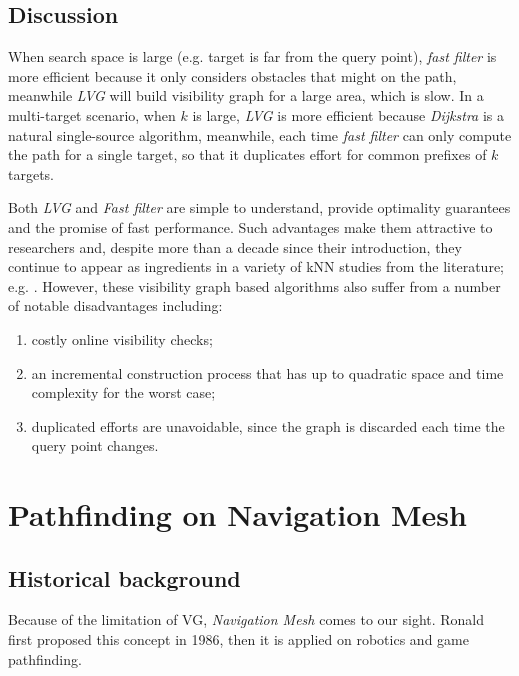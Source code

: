 \subsection{Discussion}
When search space is large (e.g. target is far from the query point), \textit{fast
filter}\cite{xia2004fast} is
more efficient because it only considers obstacles that might on the path, meanwhile
\textit{LVG}\cite{zhang2004spatial} will build visibility graph for a large area, which is slow. 
In a multi-target scenario, when $k$ is large, \textit{LVG}\cite{zhang2004spatial} is more efficient because
\textit{Dijkstra} is a natural single-source algorithm, meanwhile, each time \textit{fast
filter}\cite{xia2004fast} can
only compute the path for a single target, so that it duplicates effort for common prefixes of $k$
targets.

Both \textit{LVG}\cite{zhang2004spatial} and \textit{Fast filter}\cite{xia2004fast} are simple to understand,
provide optimality guarantees and the promise of fast performance. Such advantages make them
attractive to researchers and, despite more than a decade since their introduction,
they continue to appear as ingredients in a variety of kNN studies from the literature; e.g.
\cite{gao2011efficient,gao2016reverse}.
However, these visibility graph based algorithms also suffer from a number of notable
disadvantages including:
\begin{enumerate}[label=(\roman*)]
  \item costly online visibility checks;
  \item an incremental construction process that has up to quadratic space and time complexity for the worst case;
  \item duplicated efforts are unavoidable, since the graph is discarded each time the query point changes.
\end{enumerate}

\section{Pathfinding on Navigation Mesh}\label{lrnav}

\subsection{Historical background}
Because of the limitation of VG, \textit{Navigation Mesh} comes to our sight.
Ronald first proposed this concept in 1986\cite{ronald1986pathfinding}, then it is applied on
robotics and game pathfinding.

